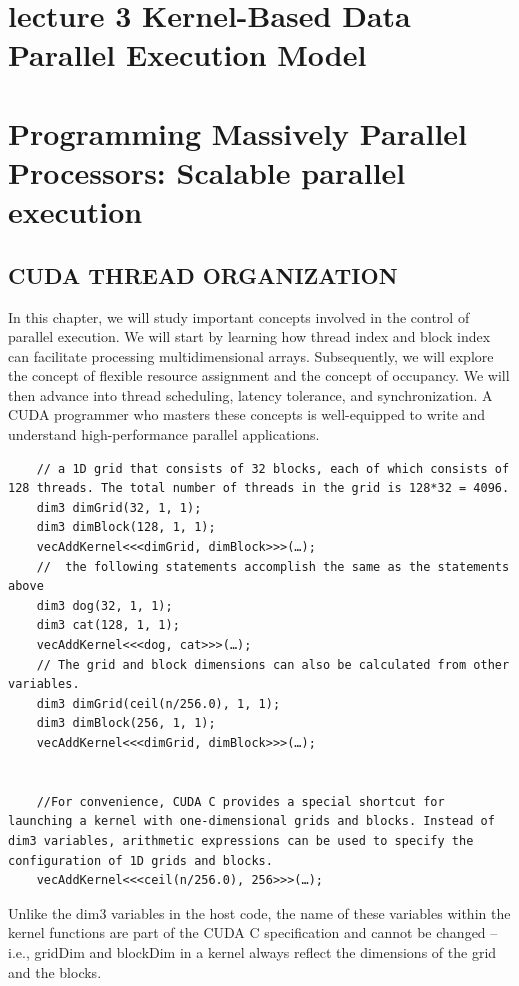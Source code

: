 \documentclass[11pt]{ctexart}
\begin{document}
\section{lecture 3 Kernel-Based
	Data Parallel Execution Model}

\newpage
\section{Programming Massively Parallel Processors: Scalable parallel execution}

\subsection{CUDA THREAD ORGANIZATION}

In this chapter, we will study important concepts involved in the control of parallel execution. We will start by learning how thread index and block index can facilitate processing multidimensional arrays. Subsequently, we will explore the concept of flexible resource assignment and the concept of occupancy. We will then advance into thread scheduling, latency tolerance, and synchronization. A CUDA programmer who masters these concepts is
well-equipped to write and understand high-performance parallel applications.


\begin{lstlisting}
	// a 1D grid that consists of 32 blocks, each of which consists of 128 threads. The total number of threads in the grid is 128*32 = 4096.
	dim3 dimGrid(32, 1, 1);
	dim3 dimBlock(128, 1, 1);
	vecAddKernel<<<dimGrid, dimBlock>>>(…);
	//  the following statements accomplish the same as the statements above
	dim3 dog(32, 1, 1);
	dim3 cat(128, 1, 1);
	vecAddKernel<<<dog, cat>>>(…);
	// The grid and block dimensions can also be calculated from other variables.
	dim3 dimGrid(ceil(n/256.0), 1, 1);
	dim3 dimBlock(256, 1, 1);
	vecAddKernel<<<dimGrid, dimBlock>>>(…);
	
	
	//For convenience, CUDA C provides a special shortcut for launching a kernel with one-dimensional grids and blocks. Instead of dim3 variables, arithmetic expressions can be used to specify the configuration of 1D grids and blocks. 
	vecAddKernel<<<ceil(n/256.0), 256>>>(…);
\end{lstlisting}

Unlike the dim3 variables in  the host code, the name of these variables within the kernel functions are part of the CUDA C specification and cannot be changed --i.e., gridDim and blockDim in a kernel always reflect the dimensions of the grid and the blocks.
\end{document}
